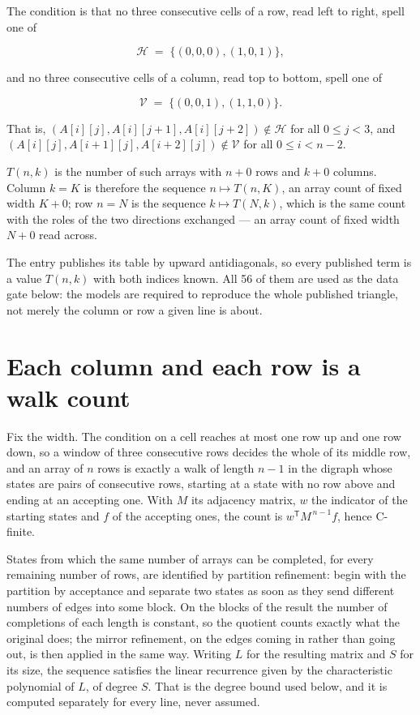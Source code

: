 \documentclass[11pt]{article}
\theoremstyle{definition}
\begin{document}
The condition is that no three consecutive cells of a row, read left to right, spell one of

\[\mathcal{H} \;=\; \{(0,0,0), (1,0,1)\},\]

and no three consecutive cells of a column, read top to bottom, spell one of

\[\mathcal{V} \;=\; \{(0,0,1), (1,1,0)\}.\]

That is, $(A[i][j],A[i][j{+}1],A[i][j{+}2]) \notin \mathcal{H}$ for all $0 \le j < 3$, and $(A[i][j],A[i{+}1][j],A[i{+}2][j]) \notin \mathcal{V}$ for all $0 \le i < n-2$.

$T(n,k)$ is the number of such arrays with $n + 0$ rows and $k + 0$ columns. Column $k = K$ is therefore the sequence $n \mapsto T(n,K)$, an array count of fixed width $K + 0$; row $n = N$ is the sequence $k \mapsto T(N,k)$, which is the same count with the roles of the two directions exchanged --- an array count of fixed width $N + 0$ read across.

The entry publishes its table by upward antidiagonals, so every published term is a value $T(n,k)$ with both indices known. All 56 of them are used as the data gate below: the models are required to reproduce the whole published triangle, not merely the column or row a given line is about.

\section{Each column and each row is a walk count}

Fix the width. The condition on a cell reaches at most one row up and one row down, so a window of three consecutive rows decides the whole of its middle row, and an array of $n$ rows is exactly a walk of length $n-1$ in the digraph whose states are pairs of consecutive rows, starting at a state with no row above and ending at an accepting one. With $M$ its adjacency matrix, $w$ the indicator of the starting states and $f$ of the accepting ones, the count is $w^{\mathsf T}M^{\,n-1}f$, hence C-finite.

States from which the same number of arrays can be completed, for every remaining number of rows, are identified by partition refinement: begin with the partition by acceptance and separate two states as soon as they send different numbers of edges into some block. On the blocks of the result the number of completions of each length is constant, so the quotient counts exactly what the original does; the mirror refinement, on the edges coming in rather than going out, is then applied in the same way. Writing $L$ for the resulting matrix and $S$ for its size, the sequence satisfies the linear recurrence given by the characteristic polynomial of $L$, of degree $S$. That is the degree bound used below, and it is computed separately for every line, never assumed.
\end{document}
